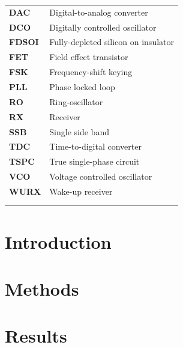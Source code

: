 \documentclass[10pt,a4paper]{article}
\begin{document}
	\begin{tabular}{@{}ll}
		\textbf{\textsf{DAC}}& 	Digital-to-analog converter\\
		\textbf{\textsf{DCO}}& 	Digitally controlled oscillator\\
		\textbf{\textsf{FDSOI}} &  Fully-depleted silicon on insulator	\\
		\textbf{\textsf{FET}} &  Field effect transistor	\\
		\textbf{\textsf{FSK}} &  Frequency-shift keying	\\
		\textbf{\textsf{PLL}} &  Phase locked loop	\\
		\textbf{\textsf{RO}}& 	Ring-oscillator\\
		\textbf{\textsf{RX}}& 	Receiver\\
		\textbf{\textsf{SSB}}& 	Single side band\\
		\textbf{\textsf{TDC}}& 	Time-to-digital converter \\
		\textbf{\textsf{TSPC}}& 	True single-phase circuit\\
		\textbf{\textsf{VCO}}& 	Voltage controlled oscillator\\
		\textbf{\textsf{WURX}}& 	Wake-up receiver\\
		& 	\\
		& 	\\
	\end{tabular}


	\pagebreak
	\FloatBarrier
    \section{Introduction}

    \section{Methods}

    \section{Results}
\end{document}
